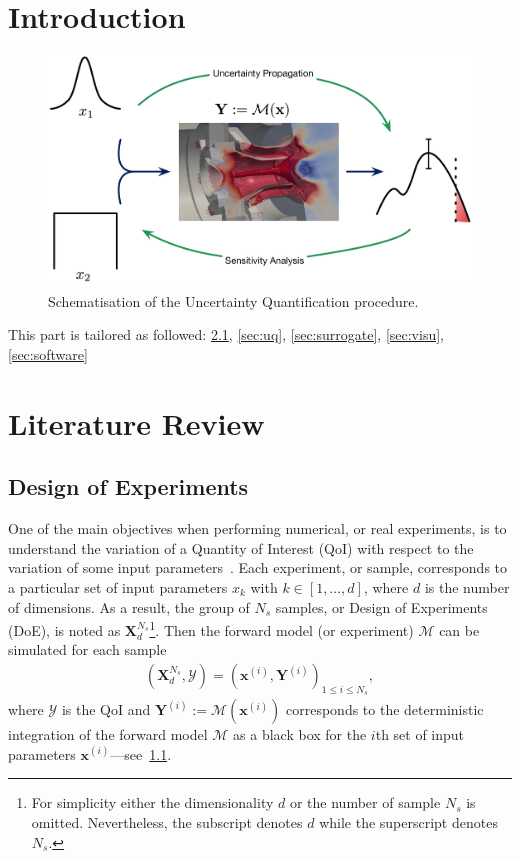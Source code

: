 \chapter{Introduction}


\begin{figure}[H]
\centering
\includegraphics[width=0.8\linewidth,keepaspectratio]{fig/literature/schema_UQ.pdf}
\caption{Schematisation of the Uncertainty Quantification procedure.}
\label{fig:doe}
\end{figure}

This part is tailored as followed: \cref{sec:doe}, \cref{sec:uq}, \cref{sec:surrogate}, \cref{sec:visu}, \cref{sec:software}

\chapter{Literature Review}

\section{Design of Experiments}\label{sec:doe}

One of the main objectives when performing numerical, or real experiments, is to understand the variation of a Quantity of Interest (QoI) with respect to the variation of some input parameters~\citep{Sacks1989}. Each experiment, or sample, corresponds to a particular set of input parameters $x_k$ with $k \in [1, \dots , d]$, where $d$ is the number of dimensions. As a result, the group of $N_s$ samples, or Design of Experiments (DoE), is noted as $\mathbf{X}^{N_s}_d${\color[rgb]{0.9,0.2,0.16}\footnote{For simplicity either the dimensionality $d$ or the number of sample $N_s$ is omitted. Nevertheless, the subscript denotes $d$ while the superscript denotes $N_s$.}}. Then the forward model (or experiment) $\mathcal{M}$ can be simulated for each sample
\begin{align}
(\mathbf{X}^{N_s}_d, \mathcal{Y})=\left(\mathbf{x}^{(i)},\mathbf{Y}^{(i)}\right)_{1\leq i\leq N_{s}},
\end{align}
\noindent where $\mathcal{Y}$ is the QoI and $\mathbf{Y}^{(i)} := \mathcal{M}(\mathbf{x}^{(i)})$ corresponds to the deterministic integration of the forward model $\mathcal{M}$ as a black box for the $i$th set of input parameters $\mathbf{x}^{(i)}$---see~\cref{fig:doe}.

